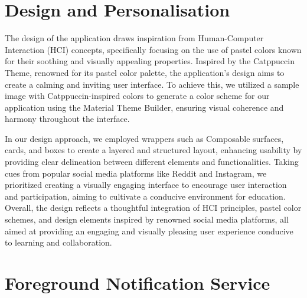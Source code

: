 \section{Design and Personalisation}

The design of the application draws inspiration from Human-Computer Interaction (HCI) concepts, specifically focusing on the use of pastel colors known for their soothing and visually appealing properties. Inspired by the Catppuccin Theme, renowned for its pastel color palette, the application's design aims to create a calming and inviting user interface. To achieve this, we utilized a sample image with Catppuccin-inspired colors to generate a color scheme for our application using the Material Theme Builder, ensuring visual coherence and harmony throughout the interface.

In our design approach, we employed wrappers such as Composable surfaces, cards, and boxes to create a layered and structured layout, enhancing usability by providing clear delineation between different elements and functionalities. Taking cues from popular social media platforms like Reddit and Instagram, we prioritized creating a visually engaging interface to encourage user interaction and participation, aiming to cultivate a conducive environment for education. Overall, the design reflects a thoughtful integration of HCI principles, pastel color schemes, and design elements inspired by renowned social media platforms, all aimed at providing an engaging and visually pleasing user experience conducive to learning and collaboration.

\section{Foreground Notification Service}
